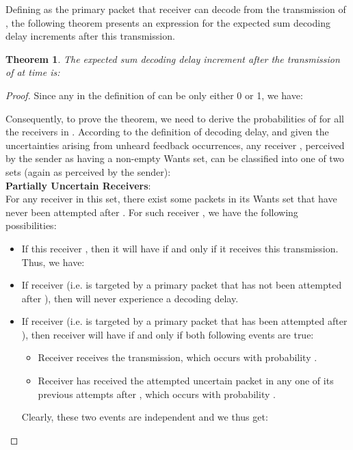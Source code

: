 \documentclass[10pt,jounral]{IEEEtran}
\newtheorem{theorem}{Theorem}
\begin{document}
Defining  as the primary packet that receiver  can decode from the transmission of , the following theorem presents an expression for the expected sum decoding delay increments after this transmission.
\begin{theorem}\label{th:decoding-delay}
The expected sum decoding delay increment after the transmission of  at time  is:

\end{theorem}
\begin{proof}
Since any  in the definition of  can be only either 0 or 1, we have:
\begin{singlecol}

\end{singlecol}
\begin{doublecol}

\end{doublecol}
Consequently, to prove the theorem, we need to derive the probabilities of  for all the receivers in . According to the definition of decoding delay, and given the uncertainties arising from unheard feedback occurrences, any receiver , perceived by the sender as having a non-empty Wants set, can be classified into one of two sets (again as perceived by the sender):\\\textbf{Partially Uncertain Receivers}: \\
For any receiver  in this set, there exist some packets in its Wants set that have never been attempted after . For such receiver , we have the following possibilities:
\begin{itemize}
\item If this receiver , then it will have  if and only if it receives this transmission. Thus, we have:

\item If receiver  (i.e.  is targeted by a primary packet that has not been attempted after ), then  will never experience a decoding delay.
\item If receiver  (i.e.  is targeted by a primary packet that has been attempted after ), then receiver  will have  if and only if both following events are true:
\begin{itemize}
\item Receiver  receives the transmission, which occurs with probability .
\item Receiver  has received the attempted uncertain packet  in any one of its previous attempts after , which occurs with probability .
\end{itemize}
Clearly, these two events are independent and we thus get:


\end{itemize}
\end{proof}
\end{document}
